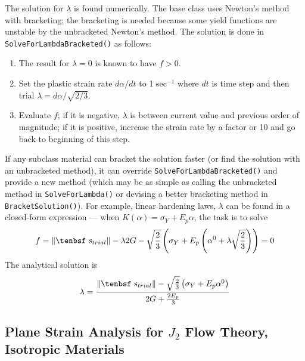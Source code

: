 \documentclass[11pt]{article}
\def\dev{\hbox{\tenbsf s}}
\begin{document}
The solution for $\lambda$ is found numerically. The base class uses Newton's method with bracketing; the bracketing is needed because some yield functions are unstable by the unbracketed Newton's method. The solution is done in {\tt SolveForLambdaBracketed()} as follows:

\begin{enumerate}

\item The result for $\lambda=0$ is known to have $f>0$.

\item Set the plastic strain rate $d\alpha/dt$ to 1 sec$^{-1}$ where $dt$ is time step and then trial $\lambda=d\alpha/\sqrt{2/3}$.

\item Evaluate $f$; if it is negative, $\lambda$ is between current value and previous order of magnitude; if it is positive, increase the strain rate by a factor or 10 and go back to beginning of this step.

\end{enumerate}

If any subclass material can bracket the solution faster (or find the solution with an unbracketed method), it can override {\tt SolveForLambdaBracketed()} and provide a new method (which may be as simple as calling the unbracketed method in {\tt SolveForLambda()} or devising a better bracketing method in {\tt BracketSolution()}). For example, linear hardening laws, $\lambda$ can be found in a closed-form expression --- when $K(\alpha)=\sigma_Y + E_p\alpha$, the task is to solve
\begin{equation}
      f =  \|\dev_{trial}\| - \lambda 2G -  \sqrt{2\over3} \left(\sigma_Y + E_p\left(\alpha^{0}+ \lambda \sqrt{2\over3}\right)\right) = 0
\end{equation}
The analytical solution is
\begin{equation}
      \lambda = { \|\dev_{trial}\| - \sqrt{2\over3}\left(\sigma_Y + E_p\alpha^{0} \right) \over  2G +  {2E_p\over3} }
\end{equation}

\subsection{Plane Strain Analysis for $J_2$ Flow Theory, Isotropic Materials}
\end{document}
